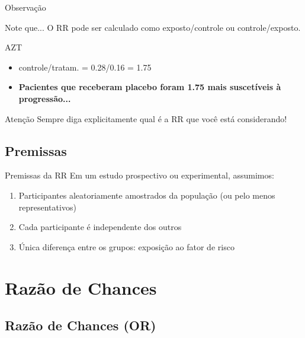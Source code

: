 \documentclass{beamer}
\begin{document}
\begin{frame}{Observação}
  \begin{block}{Note que...}
    O RR pode ser calculado como exposto/controle ou controle/exposto.
  \end{block}
  \begin{exampleblock}{AZT}
    \begin{itemize}
    \item controle/tratam. = 0.28/0.16 = 1.75
    \item {\bf Pacientes que receberam placebo foram 1.75 mais suscetíveis à progressão...}
    \end{itemize}
  \end{exampleblock}
  \begin{block}{Atenção}
    Sempre diga explicitamente qual é a RR que você está considerando!
  \end{block}
\end{frame}

\subsection{Premissas}

\begin{frame}{Premissas da RR}
  Em um estudo prospectivo ou experimental, assumimos:
  \begin{enumerate}
  \item Participantes aleatoriamente amostrados da população (ou pelo menos representativos)
  \item Cada participante é independente dos outros
  \item Única diferença entre os grupos: exposição ao fator de risco
  \end{enumerate}
\end{frame}

\section{Razão de Chances}

\subsection{Razão de Chances (OR)}
\end{document}
